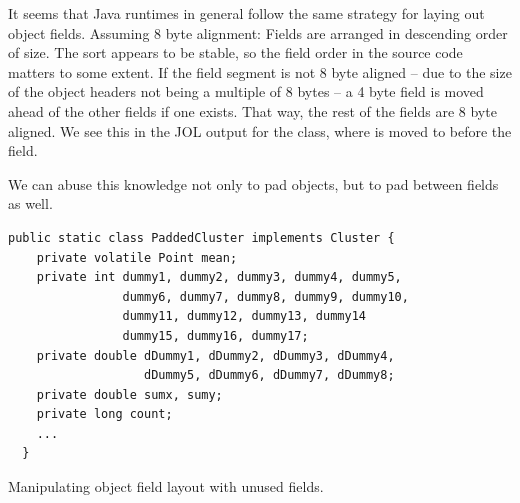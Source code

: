 It seems that Java runtimes in general follow the same strategy for laying out
object fields. Assuming 8 byte alignment: Fields are arranged in descending
order of size. The sort appears to be stable, so the field order in the source code
matters to some extent. If the field segment is not 8 byte aligned -- due to the size of the object
headers not being a multiple of 8 bytes -- a 4 byte field is moved ahead of the
other fields if one exists. That way, the rest of the fields are 8 byte aligned.
We see this in the JOL output for the  class, where
 is moved to before the  field.

We can abuse this knowledge not only to pad objects, but to pad between fields
as well.

\begin{padding}[h]
\begin{Verbatim}[frame=single]
  public static class PaddedCluster implements Cluster {
    private volatile Point mean;
    private int dummy1, dummy2, dummy3, dummy4, dummy5,
                dummy6, dummy7, dummy8, dummy9, dummy10,
                dummy11, dummy12, dummy13, dummy14
                dummy15, dummy16, dummy17;
    private double dDummy1, dDummy2, dDummy3, dDummy4,
                   dDummy5, dDummy6, dDummy7, dDummy8;
    private double sumx, sumy;
    private long count;
    ...
  }
\end{Verbatim}
	\caption{Manipulating object field layout with unused fields.}
	\label{padding:object-fields}
\end{padding}

